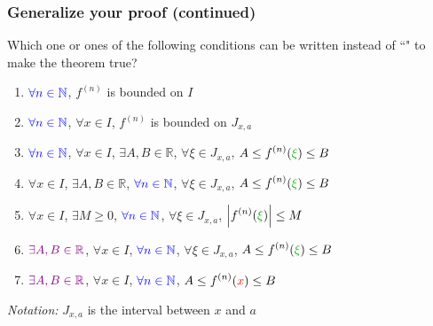 \documentclass[14pt]{beamer}
\newcommand{\R}{\mathbb{R}}
\newcommand{\N}{\mathbb{N}}
\newcommand{\azul}[1]{{\color{blue} #1}}
\newcommand{\rojo}[1]{{\color{red} #1}}
\newcommand{\verde}[1]{{\color{verde} #1}}
\newcommand{\violeta}[1]{{\color{violet} #1}}
\newcommand{\setsize}[1]{\fontsize{#1}{#1}\selectfont} %
\newcommand{\vv}{\vspace{.5cm}}
\newcommand{\vvv}{\vspace{.2cm}}
\begin{document}
	\begin{frame}[t]
		\setsize{12}
		\frametitle{Generalize your proof (continued)}

		Which one or ones of the following conditions can be written instead of ``"
		to make the theorem true? \vvv
		\begin{enumerate}
			\item ${\displaystyle \azul{\forall n \in \N}}$, \;
				${\displaystyle f^{(n)}}$ is bounded on $I$ \vvv

			\item ${\displaystyle \azul{\forall n \in \N}}$, \; \rojo{${\displaystyle \forall x \in I}$},
				\; ${\displaystyle f^{(n)}}$ is bounded on $J_{x,a}$ \vvv

			\item ${\displaystyle \azul{\forall n \in \N}}$, \; \rojo{${\displaystyle \forall x \in I}$},
				\; \violeta{${\displaystyle \exists A, B \in \R}$}, \; \verde{${\displaystyle \forall \xi \in J_{x,a}}$},
				\; ${\displaystyle A \leq f^{(n)}(\verde{\xi}) \leq B}$ \vvv

			\item \rojo{${\displaystyle \forall x \in I}$}, \; \violeta{${\displaystyle \exists A, B \in \R}$},
				\; ${\displaystyle \azul{\forall n \in \N}}$, \; \verde{${\displaystyle \forall \xi \in J_{x,a}}$},
				\; ${\displaystyle A \leq f^{(n)}(\verde{\xi}) \leq B}$ \vvv

			\item \rojo{${\displaystyle \forall x \in I}$}, \; \violeta{${\displaystyle \exists M \geq 0}$},
				\; ${\displaystyle \azul{\forall n \in \N}}$, \; \verde{${\displaystyle \forall \xi \in J_{x,a}}$},
				\; ${\displaystyle \left\vert f^{(n)}(\verde{\xi}) \right\vert \leq M}$
				\vvv

			\item ${\displaystyle \violeta{\exists A, B \in \R}}$, \; \rojo{${\displaystyle \forall x \in I}$},
				\; ${\displaystyle \azul{\forall n \in \N}}$, \; \verde{${\displaystyle \forall \xi \in J_{x,a}}$},
				\; ${\displaystyle A \leq f^{(n)}(\verde{\xi}) \leq B}$ \vvv

			\item ${\displaystyle \violeta{\exists A, B \in \R}}$, \; \rojo{${\displaystyle \forall x \in I}$},
				\; ${\displaystyle \azul{\forall n \in \N}}$, \; ${\displaystyle A \leq f^{(n)}(\rojo{x}) \leq B}$
		\end{enumerate}
		\vv

		\emph{Notation:} ${\displaystyle J_{x,a}}$ is the interval between $x$ and
		$a$
	\end{frame}
\end{document}
